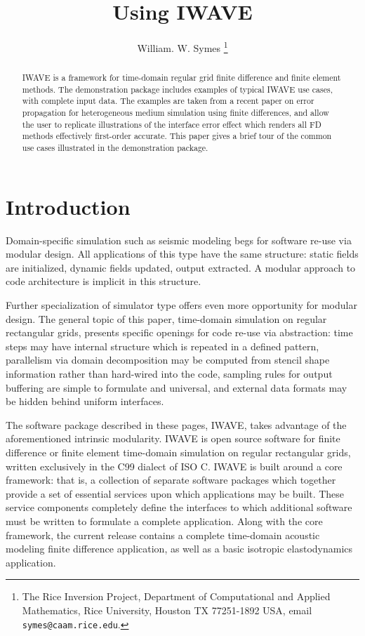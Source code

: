 \title{Using IWAVE}
\author{William. W. Symes \thanks{The Rice Inversion Project,
Department of Computational and Applied Mathematics, Rice University,
Houston TX 77251-1892 USA, email {\tt symes@caam.rice.edu}.}}

\maketitle

\begin{abstract}
  IWAVE is a framework for time-domain regular grid finite difference
  and finite element methods. The demonstration package includes
  examples of typical IWAVE use cases, with complete input data. The
  examples are taken from a recent paper on error propagation for
  heterogeneous medium simulation using finite differences, and allow
  the user to replicate illustrations of the interface error effect
  which renders all FD methods effectively first-order accurate.  This
  paper gives a brief tour of the common use cases illustrated in the demonstration package.
\end{abstract}

\section{Introduction}
Domain-specific simulation such as seismic modeling begs for
software re-use via modular design. All applications of this type have
the same structure: static fields are initialized, dynamic fields
updated, output extracted. A modular approach to code architecture is
implicit in this structure.

Further specialization of simulator type offers even more opportunity
for modular design. The general topic of this paper, time-domain
simulation on regular rectangular grids, presents specific openings
for code re-use via abstraction: time steps may have internal
structure which is repeated in a defined pattern, parallelism via
domain decomposition may be computed from stencil shape information
rather than hard-wired into the code, sampling rules for output
buffering are simple to formulate and universal, and external data
formats may be hidden behind uniform interfaces.

The software package described in these pages, IWAVE, takes advantage
of the aforementioned intrinsic modularity. IWAVE is open source
software for finite difference or finite element time-domain
simulation on regular rectangular grids, written exclusively in the
C99 dialect of ISO C. IWAVE is built around a core framework: that is,
a collection of separate software packages which together provide a
set of essential services upon which applications may be built. These
service components completely define the interfaces to which
additional software must be written to formulate a complete
application. Along with the core framework, the current release
contains a complete time-domain acoustic modeling finite difference
application, as well as a basic isotropic elastodynamics application.

